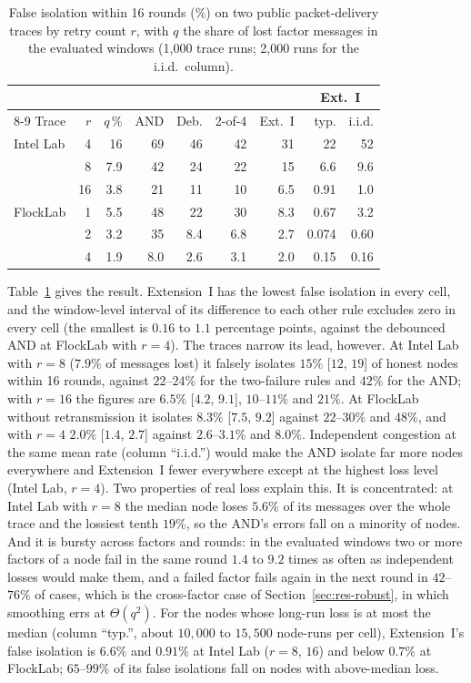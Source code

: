 \documentclass[lineno,pdflatex,sn-nature]{sn-jnl}
\theoremstyle{thmstyleone}%
\theoremstyle{thmstylethree}%
\begin{document}
\begin{table}[!t]
\caption{False isolation within 16 rounds (\%) on two public packet-delivery traces by retry count $r$, with $q$ the share of lost factor messages in the evaluated windows (1{,}000 trace runs; 2{,}000 runs for the i.i.d.\ column).}
\label{tab:trace}
\centering
\renewcommand{\arraystretch}{1.08}
\footnotesize
\setlength{\tabcolsep}{2.4pt}
\begin{tabular}{lrrrrrrrr}
\toprule
 & & & & & & & \multicolumn{2}{c}{{Ext.~I}} \\
\cmidrule(lr){8-9}
{Trace} & $r$ & $q$\,\% & AND & Deb. & 2-of-4 & Ext.~I & typ. & i.i.d. \\
\midrule
Intel Lab & 4 & 16 & 69 & 46 & 42 & {31} & 22 & 52 \\
 & 8 & 7.9 & 42 & 24 & 22 & {15} & 6.6 & 9.6 \\
 & 16 & 3.8 & 21 & 11 & 10 & {6.5} & 0.91 & 1.0 \\
\midrule
FlockLab & 1 & 5.5 & 48 & 22 & 30 & {8.3} & 0.67 & 3.2 \\
 & 2 & 3.2 & 35 & 8.4 & 6.8 & {2.7} & 0.074 & 0.60 \\
 & 4 & 1.9 & 8.0 & 2.6 & 3.1 & {2.0} & 0.15 & 0.16 \\
\bottomrule
\end{tabular}
\end{table}

Table~\ref{tab:trace} gives the result.  Extension~I has the lowest
false isolation in every cell, and the window-level interval of its
difference to each other rule excludes zero in every cell (the
smallest is $0.16$ to $1.1$ percentage points, against the debounced
AND at FlockLab with $r=4$).  The traces narrow its lead, however.  At
Intel Lab with $r=8$ ($7.9\%$ of messages lost) it falsely isolates
$15\%$ [$12$, $19$] of honest nodes within 16 rounds, against
$22$--$24\%$ for the two-failure rules and $42\%$ for the AND; with
$r=16$ the figures are $6.5\%$ [$4.2$, $9.1$], $10$--$11\%$ and $21\%$.
At FlockLab without retransmission it isolates $8.3\%$ [$7.5$, $9.2$]
against $22$--$30\%$ and $48\%$, and with $r=4$ $2.0\%$ [$1.4$, $2.7$]
against $2.6$--$3.1\%$ and $8.0\%$.  Independent congestion at the same
mean rate (column ``i.i.d.'') would make the AND isolate far more nodes
everywhere and Extension~I fewer everywhere except at the highest loss
level (Intel Lab, $r=4$).  Two properties of real loss explain this.
It is concentrated: at Intel Lab with $r=8$ the median node loses
$5.6\%$ of its messages over the whole trace and the lossiest tenth
$19\%$, so the AND's errors fall on a minority of nodes.  And it is
bursty across factors and rounds: in the evaluated windows two or more
factors of a node fail in the same round $1.4$ to $9.2$ times as often
as independent losses would make them, and a failed factor fails again
in the next round in $42$--$76\%$ of cases, which is the cross-factor
case of Section~\ref{sec:res-robust}, in which smoothing errs at
$\Theta(q^{2})$.  For the nodes whose long-run loss is at most the
median (column ``typ.'', about $10{,}000$ to $15{,}500$ node-runs per
cell), Extension~I's false isolation is $6.6\%$ and $0.91\%$ at Intel
Lab ($r=8$, $16$) and below $0.7\%$ at FlockLab; $65$--$99\%$ of its
false isolations fall on nodes with above-median loss.
\end{document}
